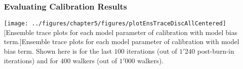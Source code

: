 \subsubsection{Evaluating Calibration Results}\label{subsub:bc_calibration_evaluation}







% 

% 

% 

\clearpage
\begin{sidewaysfigure}
	\centering
	\texttt{[image: ../figures/chapter5/figures/plotEnsTraceDiscAllCentered]}
		[Ensemble trace plots for each model parameter of calibration with model bias term.]{Ensemble trace plots for each model parameter of calibration with model bias term. Shown here is for the last $100$ iterations (out of $1'240$ post-burn-in iterations) and for $400$ walkers (out of $1'000$ walkers).}
	\label{fig:ch5_plot_ens_trace_all_disc_centered}
\end{sidewaysfigure}
\clearpage